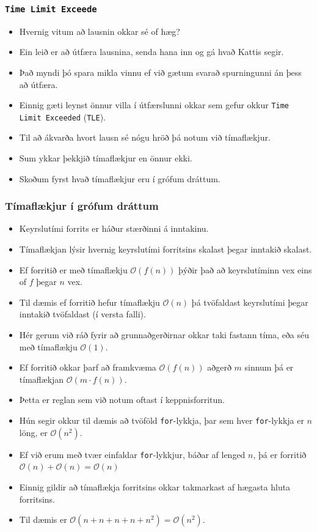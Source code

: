 \documentclass{beamer}
\newcommand\env[2]
{
	\begin{#1}
	#2
	\end{#1}
}
\begin{document}
\env{frame}
{
	\frametitle{\texttt{Time Limit Exceede}}
	\env{itemize}
	{
		\item<1-> Hvernig vitum að lausnin okkar sé of hæg?
		\item<2-> Ein leið er að útfæra lausnina, senda hana inn og gá hvað Kattis segir.
		\item<3-> Það myndi þó spara mikla vinnu ef við gætum svarað spurningunni án þess að útfæra.
		\item<4-> Einnig gæti leynst önnur villa í útfærslunni okkar sem gefur okkur \texttt{Time Limit Exceeded} (\texttt{TLE}).
		\item<5-> Til að ákvarða hvort lausn sé nógu hröð þá notum við tímaflækjur.
		\item<6-> Sum ykkar þekkjið tímaflækjur en önnur ekki.
		\item<7-> Skoðum fyrst hvað tímaflækjur eru í grófum dráttum.
	}
}

\env{frame}
{
	\frametitle{Tímaflækjur í grófum dráttum}
	\env{itemize}
	{
		\item<1-> Keyrslutími forrits er háður stærðinni á inntakinu.
		\item<2-> Tímaflækjan lýsir hvernig keyrslutími forritsins skalast þegar inntakið skalast.
		\item<3-> Ef forritið er með tímaflækju $\mathcal{O}(f(n))$ þýðir það að keyrslutíminn vex eins of $f$ þegar $n$ vex.
		\item<4-> Til dæmis ef forritið hefur tímaflækju $\mathcal{O}(n)$ þá tvöfaldast keyrslutími þegar inntakið tvöfaldast (í versta falli).
		\item<5-> Hér gerum við ráð fyrir að grunnaðgerðirnar okkar taki fastann tíma, eða séu með tímaflækju $\mathcal{O}(1)$.
	}
}

\env{frame}
{
	\env{itemize}
	{
		\item<1-> Ef forritið okkar þarf að framkvæma $\mathcal{O}(f(n))$ aðgerð $m$ sinnum þá er tímaflækjan $\mathcal{O}(m \cdot f(n))$.
		\item<2-> Þetta er reglan sem við notum oftast í keppnisforritun.
		\item<3-> Hún segir okkur til dæmis að tvöföld \texttt{for}-lykkja, þar sem hver \texttt{for}-lykkja er $n$ löng, er $\mathcal{O}(n^2)$.
		\item<4-> Ef við erum með tvær einfaldar \texttt{for}-lykkjur, báðar af lenged $n$, þá er forritið 
			$\mathcal{O}(n) + \mathcal{O}(n) = \mathcal{O}(n)$
		\item<5-> Einnig gildir að tímaflækja forritsins okkar takmarkast af hægasta hluta forritsins.
		\item<6-> Til dæmis er
			$\mathcal{O}(n + n + n + n + n^2) = \mathcal{O}(n^2)$.
	}
}
\end{document}

